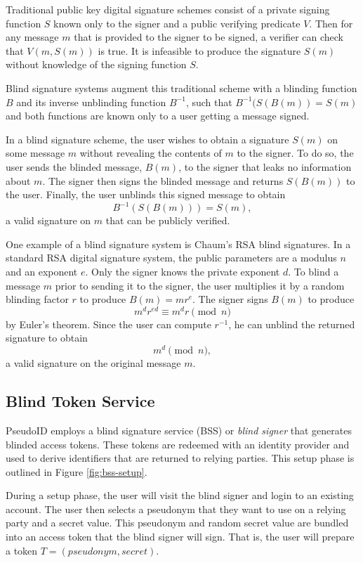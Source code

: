 \documentclass{llncs}
\begin{document}
Traditional public key digital signature schemes \cite{DH76} consist
of a private signing function $S$ known only to the signer and a
public verifying predicate $V$. Then for any message $m$ that is
provided to the signer to be signed, a verifier can check that $V(m,
S(m))$ is true. It is infeasible to produce the signature $S(m)$
without knowledge of the signing function $S$.

Blind signature systems \cite{Cha82} augment this traditional scheme
with a blinding function $B$ and its inverse unblinding function
$B^{-1}$, such that $B^{-1}(S(B(m)) = S(m)$ and both
functions are known only to a user getting a message signed.

In a blind signature scheme, the user wishes to obtain a signature
$S(m)$ on some message $m$ without revealing the contents of $m$ to
the signer. To do so, the user sends the blinded message, $B(m)$, to
the signer that leaks no information about $m$. The signer then signs
the blinded message and returns $S(B(m))$ to the user. Finally, the
user unblinds this signed message to obtain $$B^{-1}(S(B(m))) =
S(m),$$ a valid signature on $m$ that can be publicly verified.

One example of a blind signature system is Chaum's RSA blind
signatures. In a standard RSA digital signature system, the public
parameters are a modulus $n$ and an exponent $e$. Only the signer
knows the private exponent $d$. To blind a message $m$ prior to
sending it to the signer, the user multiplies it by a random blinding
factor $r$ to produce $B(m) = mr^e$. The signer signs $B(m)$ to
produce $$m^d r^{ed} \equiv m^d r \pmod n$$ by Euler's theorem. Since
the user can compute $r^{-1}$, he can unblind the returned signature
to obtain $$m^d \pmod n,$$ a valid signature on the original message
$m$.

\subsection{Blind Token Service}

PseudoID employs a blind signature service (BSS) or 
\emph{blind signer} that generates blinded access tokens. These tokens are
redeemed with an identity provider and used to derive identifiers that
are returned to relying parties. This setup phase is outlined in
Figure \ref{fig:bss-setup}.

During a setup phase, the user will visit the blind signer and login
to an existing account. The user then selects a pseudonym that they
want to use on a relying party and a secret value. This pseudonym and
random secret value are bundled into an access token that the blind
signer will sign. That is, the user will prepare a token $T =
(pseudonym, secret)$.
\end{document}
